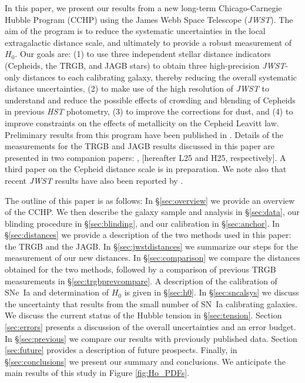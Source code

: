 \documentclass[12pt,modern]{aastex631}
\newcommand{\ho}{$H_{0}$\xspace}
\newcommand{\hst}{\emph{HST}\xspace}
\newcommand{\jwst}{\emph{JWST}\xspace}
\newcommand{\sne}{SNe~Ia\xspace}
\newcommand{\sn}{SN~Ia\xspace}
\begin{document}
In this paper, we present our results from a new long-term Chicago-Carnegie Hubble Program (CCHP) using the James Webb Space Telescope (\jwst). The aim of the program is to reduce the systematic uncertainties in the local extragalactic distance scale, and ultimately to provide a  robust measurement of \ho. Our goals are: (1)  to use  three independent stellar distance indicators (Cepheids, the TRGB, and JAGB stars) to obtain three high-precision \jwst-only  distances to  each calibrating galaxy, thereby reducing the overall systematic distance uncertainties, (2) to make use of the high resolution of \jwst to understand and reduce the possible effects of crowding and blending of Cepheids  in previous \hst photometry, (3) to   improve the corrections for dust, and (4) to improve constraints on the effects of metallicity on the Cepheid Leavitt law. Preliminary results from this program  have been published in \citep{lee_2024a, owens_2025a,   hoyt_2025a, freedman_madore_2023a, freedman_madore_2023b}.  Details of the measurements   for the TRGB and JAGB results discussed in this paper
are presented in two companion papers: \citet{lee_2024c}, \citet{hoyt_2025b} [hereafter L25 and  H25, respectively]. A third paper on the Cepheid distance scale \citep{owens_2025b} is in preparation.
We note also that recent \jwst results have also been reported by \citet{yuan_2022,riess_2023, li_2024,riess_2024a,riess_2024b, li_2025}. \rm



The outline of this paper is as follows: In \S \ref{sec:overview} we provide an overview of the CCHP. We then describe the galaxy sample and analysis in \S \ref{sec:data}, our blinding procedure in \S \ref{sec:blinding}, and our calibration in \S \ref{sec:anchor}. In \S \ref{sec:distances}  we provide a description of the  two \rm methods used in this paper:  the TRGB and the JAGB. In \S \ref{sec:jwstdistances} we summarize our steps for the measurement of our new distances. In \S \ref{sec:comparison} we compare the distances obtained for the  two methods, followed by a comparison of previous TRGB measurements in \S \ref{sec:trgbprevcompare}.
A description of the calibration of \sne and determination of \ho is given in \S \ref{sec:h0}. 
In \S \ref{sec:sncalsys} we discuss the uncertainty that results from the small number of \sn calibrating galaxies. 
We discuss the current status of the Hubble tension in \S\ref{sec:tension}. Section \ref{sec:errors} presents a discussion of the overall uncertainties and an error budget. In \S \ref{sec:previous} we compare our results with previously published data. 
Section \ref{sec:future} provides a description of future prospects. Finally, in \S \ref{sec:conclusions} we present our summary and conclusions. We anticipate the main results of this study in Figure \ref{fig:Ho_PDFs}. 
\par\noindent
\end{document}
